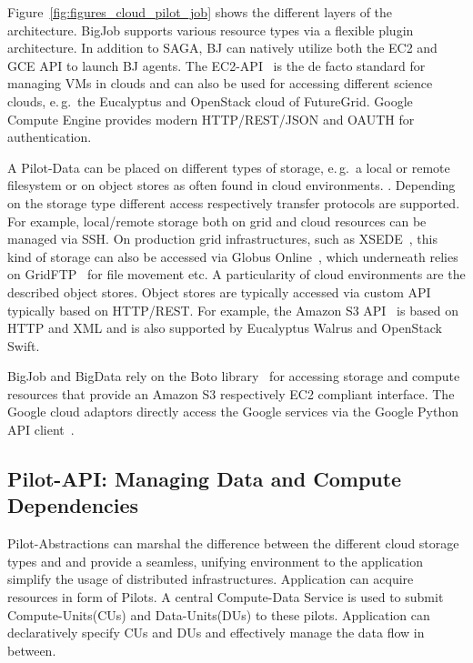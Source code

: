 \documentclass[times]{cpeauth}
\newcommand{\pilots}{Pilots\xspace}
\newcommand{\pilotdata}{Pilot-Data\xspace}
\newcommand{\computedataservice}{Compute-Data Service\xspace}
\newcommand{\computeunits}{Compute-Units\xspace}
\newcommand{\dataunits}{Data-Units\xspace}
\newcommand{\dus}{DUs\xspace}
\newcommand{\cus}{CUs\xspace}
\begin{document}
Figure~\ref{fig:figures_cloud_pilot_job} shows the different layers of the
architecture. BigJob supports various resource types via a flexible plugin
architecture. In addition to SAGA, BJ can natively utilize both the EC2 and
GCE API to launch BJ agents. The EC2-API~\cite{amazonec2api} is the de facto 
standard for managing VMs in clouds and can also be used for accessing 
different science clouds, e.\,g.\ the Eucalyptus and OpenStack cloud of 
FutureGrid. Google Compute Engine provides modern HTTP/REST/JSON and OAUTH for 
authentication. 

A \pilotdata can be placed on different types of storage, e.\,g.\ a local or
remote filesystem or on object stores as often found in cloud environments. .
Depending on the storage type different access respectively transfer protocols
are supported. For example, local/remote storage both on grid and cloud
resources can be managed via SSH. On production grid infrastructures, such as
XSEDE~\cite{xsede}, this kind of storage can also be accessed via Globus
Online~\cite{10.1109/MIC.2011.64}, which underneath relies on
GridFTP~\cite{ogf-gfd-20} for file movement etc. A particularity of cloud
environments are the described object stores. Object stores are typically
accessed via custom API typically based on HTTP/REST. For example, the Amazon
S3 API~\cite{amazons3api} is based on HTTP and XML and is also supported by
Eucalyptus Walrus and OpenStack Swift.

BigJob and BigData rely on the Boto library~\cite{boto} for accessing storage
and compute resources that provide an Amazon S3 respectively EC2 compliant
interface. The Google cloud adaptors directly access the Google services via
the Google Python API client~\cite{google-api-client}.




\subsection{Pilot-API: Managing Data and Compute Dependencies}

Pilot-Abstractions can marshal the difference between the different cloud
storage types and and provide a seamless, unifying environment to the
application simplify the usage of distributed infrastructures. Application can 
acquire resources in form of \pilots. A central \computedataservice is used to 
submit \computeunits (\cus) and \dataunits (\dus) to these pilots. Application 
can declaratively specify \cus and \dus and effectively manage the data flow 
in between. 
\end{document}
